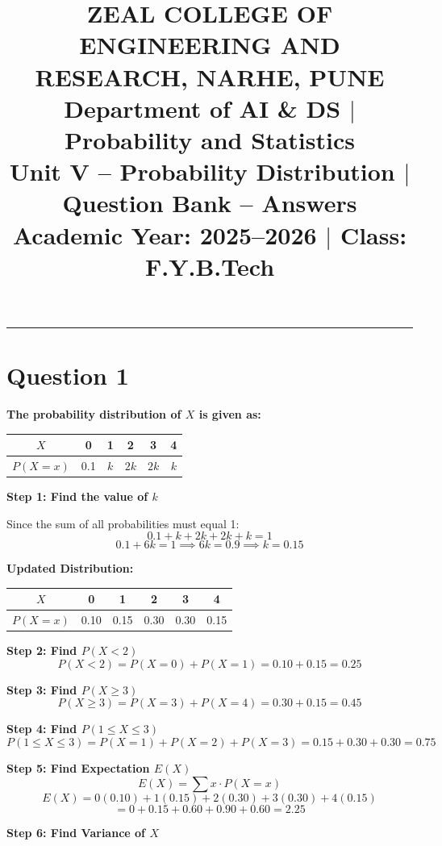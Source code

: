 \documentclass[12pt,a4paper]{article}
\title{\textbf{ZEAL COLLEGE OF ENGINEERING AND RESEARCH, NARHE, PUNE}\\[0.4em]
\large Department of AI \& DS $|$ Probability and Statistics\\
\large Unit V -- Probability Distribution $|$ Question Bank -- Answers\\
Academic Year: 2025--2026 $|$ Class: F.Y.B.Tech}
\date{}
\begin{document}
\maketitle
\thispagestyle{fancy}
\hrule
\vspace{1em}

\section{Question 1}
\textbf{The probability distribution of $X$ is given as:}

\begin{center}
\begin{tabular}{|c|c|c|c|c|c|}
\hline
$X$ & 0 & 1 & 2 & 3 & 4 \\
\hline
$P(X=x)$ & 0.1 & $k$ & $2k$ & $2k$ & $k$ \\
\hline
\end{tabular}
\end{center}

\textbf{Step 1: Find the value of $k$}

Since the sum of all probabilities must equal 1:
\[
0.1 + k + 2k + 2k + k = 1
\]
\[
0.1 + 6k = 1 \implies 6k = 0.9 \implies \boxed{k = 0.15}
\]

\textbf{Updated Distribution:}
\begin{center}
\begin{tabular}{|c|c|c|c|c|c|}
\hline
$X$ & 0 & 1 & 2 & 3 & 4 \\
\hline
$P(X=x)$ & 0.10 & 0.15 & 0.30 & 0.30 & 0.15 \\
\hline
\end{tabular}
\end{center}

\textbf{Step 2: Find $P(X < 2)$}
\[
P(X < 2) = P(X=0) + P(X=1) = 0.10 + 0.15 = \boxed{0.25}
\]

\textbf{Step 3: Find $P(X \geq 3)$}
\[
P(X \geq 3) = P(X=3) + P(X=4) = 0.30 + 0.15 = \boxed{0.45}
\]

\textbf{Step 4: Find $P(1 \leq X \leq 3)$}
\[
P(1 \leq X \leq 3) = P(X=1) + P(X=2) + P(X=3) = 0.15 + 0.30 + 0.30 = \boxed{0.75}
\]

\textbf{Step 5: Find Expectation $E(X)$}
\[
E(X) = \sum x \cdot P(X=x)
\]
\[
E(X) = 0(0.10) + 1(0.15) + 2(0.30) + 3(0.30) + 4(0.15)
\]
\[
= 0 + 0.15 + 0.60 + 0.90 + 0.60 = \boxed{2.25}
\]

\textbf{Step 6: Find Variance of $X$}
\end{document}
